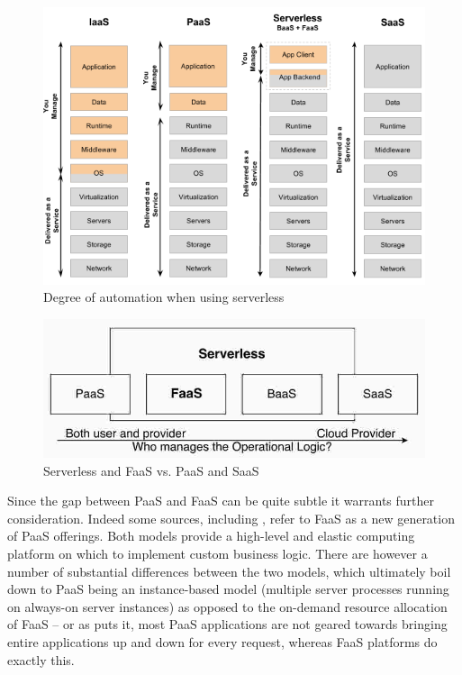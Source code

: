 \documentclass[utf8,english]{gradu3}
\begin{document}
\begin{figure}[h]
  \centering
  \includegraphics[width=\textwidth]{specify-io-cloud-comparison.png}
  \caption{Degree of automation when using serverless \parencite{wolf16serverless}}
  \label{fig:degreeOfAutomation}
\end{figure}

\begin{figure}[h]
  \centering
  \includegraphics[width=\textwidth]{eyk17-cloud-comparison.jpg}
  \caption{Serverless and FaaS vs. PaaS and SaaS \parencite{van2017spec}}
  \label{fig:cloudSpectrum}
\end{figure}

Since the gap between PaaS and FaaS can be quite subtle it warrants further consideration. Indeed some sources, including \textcite{adzic2017serverless}, refer to FaaS as a new generation of PaaS offerings. Both models provide a high-level and elastic computing platform on which to implement custom business logic. There are however a number of substantial differences between the two models, which ultimately boil down to PaaS being an instance-based model (multiple server processes running on always-on server instances) as opposed to the on-demand resource allocation of FaaS -- or as \textcite{robert2016serverlessarchitectures} puts it, most PaaS applications are not geared towards bringing entire applications up and down for every request, whereas FaaS platforms do exactly this.
\end{document}
